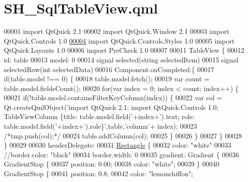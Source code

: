 \hypertarget{SH__SqlTableView_8qml}{\section{S\-H\-\_\-\-Sql\-Table\-View.\-qml}
\label{SH__SqlTableView_8qml}
}

\begin{DoxyCode}
00001 \textcolor{keyword}{import} QtQuick 2.1
00002 import QtQuick.Window 2.1
00003 import QtQuick.Controls 1.0
\hypertarget{SH__SqlTableView_8qml_source_l00004}{}\hyperlink{classSH__SqlTableView}{00004} import QtQuick.Controls.Styles 1.0
00005 import QtQuick.Layouts 1.0
00006 import PreCheck 1.0
00007 
00011 TableView \{
00012     \textcolor{keywordtype}{id}: table
00013     model: 0
00014     signal selected(\textcolor{keywordtype}{string} selectedItem)
00015     signal selectedRow(\textcolor{keywordtype}{int} selectedData)
00016     Component.onCompleted:\{
00017         \textcolor{keywordflow}{if}(table.model !== 0) \{
00018             table.model.fetch();
00019             var count = table.model.fieldsCount();
00020             \textcolor{keywordflow}{for}(var index = 0; index < count; index++) \{
00021                 \textcolor{keywordflow}{if}(!table.model.containsFilterKeyColumn(index)) \{
00022                     var col = Qt.createQmlObject(\textcolor{stringliteral}{'import QtQuick 2.1; import QtQuick.Controls 1.0;
       TableViewColumn \{title: table.model.field('}+index+\textcolor{stringliteral}{').text; role: table.model.field('}+index+\textcolor{stringliteral}{').role\}'},table,\textcolor{stringliteral}{'column'}+
      index);
00023                     \textcolor{comment}{/*tmp.push(col);*/}
00024                     table.addColumn(col);
00025                 \}
00026             \}
00027         \}
00028     \}
00029 
00030     headerDelegate:
00031         \hyperlink{classRectangle}{Rectangle} \{
00032         color: \textcolor{stringliteral}{"white"}
00033         \textcolor{comment}{//border.color: "black"}
00034         border.width: 0
00035         gradient: Gradient \{
00036             GradientStop \{
00037                 position: 0.00;
00038                 color: \textcolor{stringliteral}{"white"};
00039             \}
00040             GradientStop \{
00041                 position: 0.8;
00042                 color: \textcolor{stringliteral}{"lemonchiffon"};

\end{DoxyCode}
